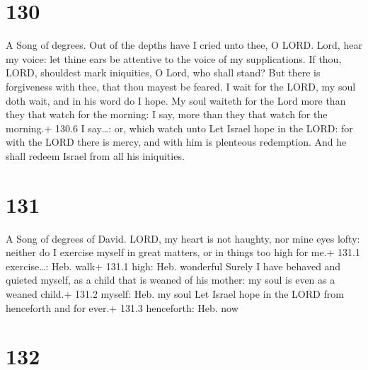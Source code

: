\hypertarget{section-130}{%
\section{130}\label{section-130}}

A Song of degrees.  Out of the depths have I cried unto
thee, O LORD.  Lord, hear my voice: let thine ears be
attentive to the voice of my supplications.  If thou, LORD,
shouldest mark iniquities, O Lord, who shall stand?  But
there is forgiveness with thee, that thou mayest be feared. 
I wait for the LORD, my soul doth wait, and in his word do I hope.
 My soul waiteth for the Lord more than they that watch for
the morning: I say, more than they that watch for the morning.+ 130.6 I
say\ldots: or, which watch unto  Let Israel hope in the
LORD: for with the LORD there is mercy, and with him is plenteous
redemption.  And he shall redeem Israel from all his
iniquities.

\hypertarget{section-131}{%
\section{131}\label{section-131}}

A Song of degrees of David.  LORD, my heart is not haughty,
nor mine eyes lofty: neither do I exercise myself in great matters, or
in things too high for me.+ 131.1 exercise\ldots: Heb. walk+ 131.1 high:
Heb. wonderful  Surely I have behaved and quieted myself, as
a child that is weaned of his mother: my soul is even as a weaned
child.+ 131.2 myself: Heb. my soul  Let Israel hope in the
LORD from henceforth and for ever.+ 131.3 henceforth: Heb. now

\hypertarget{section-132}{%
\section{132}\label{section-132}}

